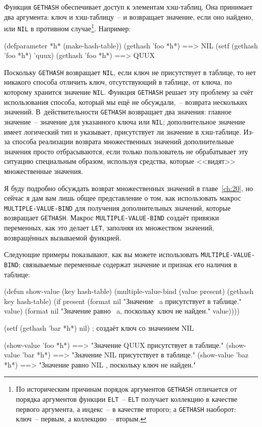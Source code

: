 Функция \lstinline{GETHASH} обеспечивает доступ к элементам хэш-таблиц.  Она принимает два
аргумента: ключ и хэш-таблицу~-- и возвращает значение, если оно найдено, или \lstinline{NIL} в
противном случае\footnote{По историческим причинам порядок аргументов \lstinline{GETHASH}
  отличается от порядка аргументов функции \lstinline{ELT}~-- \lstinline{ELT} получает коллекцию в
  качестве первого аргумента, а индекс~-- в качестве второго; а \lstinline{GETHASH} наоборот:
  ключ~-- первым, а коллекцию~-- вторым.}\hspace{\footnotenegspace}.  Например:

\begin{myverb}
(defparameter *h* (make-hash-table))
(gethash 'foo *h*) ==> NIL
(setf (gethash 'foo *h*) 'quux)
(gethash 'foo *h*) ==> QUUX
\end{myverb}

Поскольку \lstinline{GETHASH} возвращает \lstinline{NIL}, если ключ не присутствует в таблице, то нет
никакого способа отличить ключ, отсутствующий в таблице, от ключа, по которому хранится
значение \lstinline{NIL}.  Функция \lstinline{GETHASH} решает эту проблему за счёт использования
способа, который мы ещё не обсуждали,~-- возврата нескольких значений.  В~действительности
\lstinline{GETHASH} возвращает два значения: главное значение~-- значение для указанного ключа
или \lstinline{NIL};  дополнительное значение имеет логический тип и указывает, присутствует ли
значение в хэш-таблице.  Из-за способа реализации возврата множественных значений
дополнительные значения просто отбрасываются, если только пользователь не обрабатывает эту
ситуацию специальным образом, используя средства, которые <<видят>> множественные значения.

Я буду подробно обсуждать возврат множественных значений в главе~\ref{ch:20}, но сейчас я
дам вам лишь общее представление о том, как использовать макрос \lstinline{MULTIPLE-VALUE-BIND}
для получения дополнительных значений, которые возвращает \lstinline{GETHASH}.  Макрос
\lstinline{MULTIPLE-VALUE-BIND} создаёт привязки переменных, как это делает \lstinline{LET},
заполняя их множеством значений, возвращённых вызываемой функцией.

Следующие примеры показывают, как вы можете использовать \lstinline{MULTIPLE-VALUE-BIND};
связываемые переменные содержат значение и признак его наличия в таблице:

\begin{myverb}  
(defun show-value (key hash-table)
  (multiple-value-bind (value present) (gethash key hash-table)
    (if present
      (format nil "Значение ~a присутствует в таблице." value)
      (format nil "Значение равно ~a, поскольку ключ не найден." value))))

(setf (gethash 'bar *h*) nil) ; создаёт ключ со значением NIL

(show-value 'foo *h*) ==> "Значение QUUX присутствует в таблице."
(show-value 'bar *h*) ==> "Значение NIL присутствует в таблице."
(show-value 'baz *h*) ==> "Значение равно NIL , поскольку ключ не найден."
\end{myverb}

